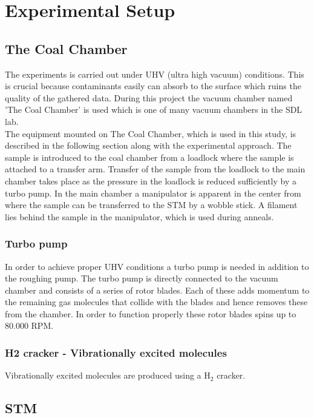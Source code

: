 \chapter{Experimental Setup}

\section{The Coal Chamber}

  The experiments is carried out under UHV (ultra high vacuum) conditions. This is crucial because contaminants easily can absorb to the surface which ruins the quality of the gathered data. During this project the vacuum chamber named 'The Coal Chamber' is used which is one of many vacuum chambers in the SDL lab.\\
  The equipment mounted on The Coal Chamber, which is used in this study, is described in the following section along with the experimental approach. The sample is introduced to the coal chamber from a loadlock where the sample is attached to a transfer arm. Transfer of the sample from the loadlock to the main chamber takes place as the pressure in the loadlock is reduced sufficiently by a turbo pump. In the main chamber a manipulator is apparent in the center from where the sample can be transferred to the STM by a wobble stick. A filament lies behind the sample in the manipulator, which is used during anneals.

\subsection{Turbo pump}

  In order to achieve proper UHV conditions a turbo pump is needed in addition to the roughing pump. The turbo pump is directly connected to the vacuum chamber and consists of a series of rotor blades. Each of these adds momentum to the remaining gas molecules that collide with the blades and hence removes these from the chamber. In order to function properly these rotor blades spins up to 80.000 RPM.\cite{hofTurbo}

\subsection{H2 cracker - Vibrationally excited molecules}

Vibrationally excited molecules are produced using a H$_2$ cracker.

\section{STM}



